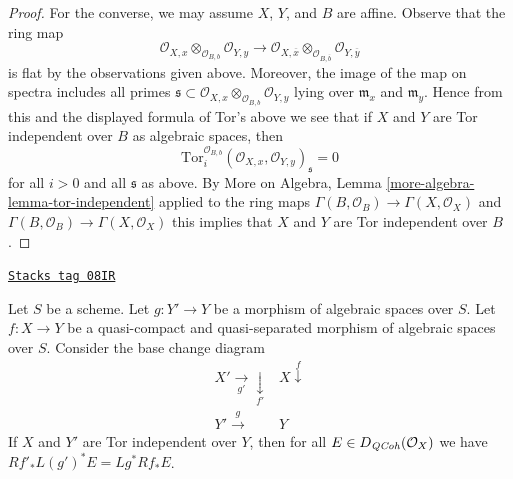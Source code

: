 \begin{proof}
\medskip\noindent
For the converse, we may assume $X$, $Y$, and $B$ are affine.
Observe that the ring map
$$
\mathcal{O}_{X, x} \otimes_{\mathcal{O}_{B, b}} \mathcal{O}_{Y, y}
\longrightarrow
\mathcal{O}_{X, \overline{x}} \otimes_{\mathcal{O}_{B, \overline{b}}}
\mathcal{O}_{Y, \overline y}
$$
is flat by the observations given above. Moreover, the image of the map
on spectra includes all primes
$\mathfrak s \subset
\mathcal{O}_{X, x} \otimes_{\mathcal{O}_{B, b}} \mathcal{O}_{Y, y}$
lying over $\mathfrak m_x$ and $\mathfrak m_y$.
Hence from this and the displayed formula of Tor's above we see that if
$X$ and $Y$ are Tor independent over $B$ as algebraic spaces, then
$$
\text{Tor}_i^{\mathcal{O}_{B, b}}
(\mathcal{O}_{X, x}, \mathcal{O}_{Y, y})_\mathfrak s = 0
$$
for all $i > 0$ and all $\mathfrak s$ as above. By
More on Algebra, Lemma \ref{more-algebra-lemma-tor-independent}
applied to the ring maps
$\Gamma(B, \mathcal{O}_B) \to \Gamma(X, \mathcal{O}_X)$
and
$\Gamma(B, \mathcal{O}_B) \to \Gamma(X, \mathcal{O}_X)$
this implies that $X$ and $Y$ are Tor independent over $B$.
\end{proof}

\begin{lemma}
\label{spaces-perfect-lemma-compare-base-change}
\href{https://stacks.math.columbia.edu/tag/08IR}{\texttt{Stacks tag 08IR}}

Let $S$ be a scheme. Let $g : Y' \to Y$ be a morphism of algebraic spaces over
$S$. Let $f : X \to Y$ be a quasi-compact and quasi-separated morphism of
algebraic spaces over $S$. Consider the base change diagram
$$
\begin{array}{cc}X' \underset{g'}{\longrightarrow}\underset{f'}{\downarrow} & X \overset{f}{\downarrow} \\ Y' \overset{g}{\longrightarrow} & Y\end{array}
$$
If $X$ and $Y'$ are Tor independent over $Y$, then for all
$E \in D_{\mathit{QCoh}}(\mathcal{O}_X)$ we have
$Rf'_*L(g')^*E = Lg^*Rf_*E$.
\end{lemma}

